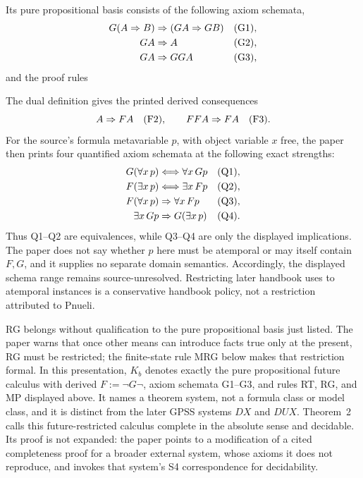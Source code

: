 Its pure propositional basis consists of the following axiom schemata,
\[
\begin{aligned}
 G(A\Rightarrow B)&\Rightarrow(GA\Rightarrow GB) &&({\rm G1}),\\
 GA&\Rightarrow A &&({\rm G2}),\\
 GA&\Rightarrow GGA &&({\rm G3}),
\end{aligned}
\]
and the proof rules
\par\noindent
\begin{minipage}{\linewidth}
\end{minipage}
\par
The dual definition gives the printed derived consequences
\[
 A\Rightarrow FA\quad({\rm F2}),
 \qquad
 FFA\Rightarrow FA\quad({\rm F3}).
\]
For the source's formula metavariable \(p\), with object variable \(x\) free,
the paper then prints four quantified axiom schemata at the following exact
strengths:
\[
\begin{aligned}
 G(\forall x\,p)&\Longleftrightarrow\forall x\,Gp &&({\rm Q1}),\\
 F(\exists x\,p)&\Longleftrightarrow\exists x\,Fp &&({\rm Q2}),\\
 F(\forall x\,p)&\Rightarrow\forall x\,Fp &&({\rm Q3}),\\
 \exists x\,Gp&\Rightarrow G(\exists x\,p) &&({\rm Q4}).
\end{aligned}
\]
Thus Q1--Q2 are equivalences, while Q3--Q4 are only the displayed
implications.  The paper does not say whether \(p\) here must be atemporal or
may itself contain \(F,G\), and it supplies no separate domain semantics.
Accordingly, the displayed schema range remains source-unresolved.  Restricting
later handbook uses to atemporal instances is a conservative handbook policy,
not a restriction attributed to Pnueli.

RG belongs without qualification to the pure propositional basis just listed.
The paper warns that once other means can introduce facts true only at the
present, RG must be restricted; the finite-state rule MRG below makes that
restriction formal.  In this presentation, \(K_b\) denotes exactly the pure
propositional future calculus with derived \(F:=\neg G\neg\), axiom schemata
G1--G3, and rules RT, RG, and MP displayed above.  It names a theorem system,
not a formula class or model class, and it is distinct from the later GPSS
systems \(DX\) and \(DUX\).  Theorem~2 calls this future-restricted calculus
complete in the absolute sense and decidable.  Its proof is not expanded: the
paper points to a modification of a cited completeness proof for a broader
external system, whose axioms it does not reproduce, and invokes that system's
S4 correspondence for decidability.

